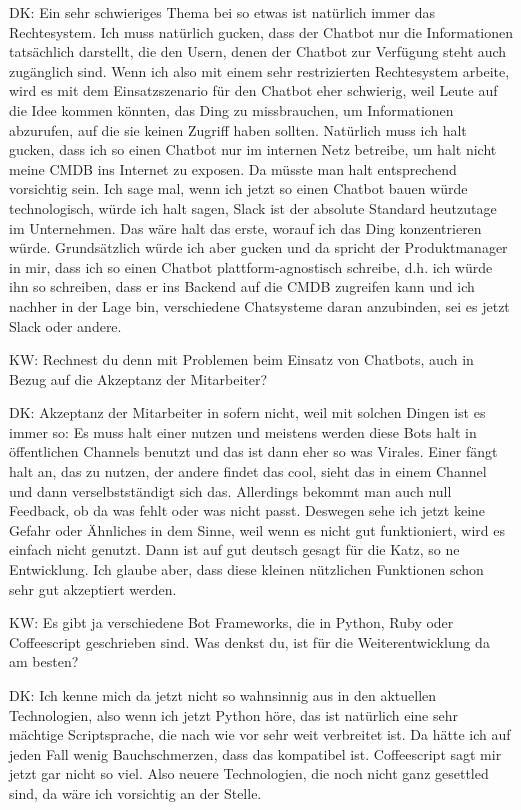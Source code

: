 \begin{list}{X:}{\setlength{\labelsep}{5mm}}
\item[DK:] Ein sehr schwieriges Thema bei so etwas ist natürlich immer das Rechtesystem. Ich muss natürlich gucken, dass der Chatbot nur die Informationen tatsächlich darstellt, die den Usern, denen der Chatbot zur Verfügung steht auch zugänglich sind. Wenn ich also mit einem sehr restrizierten Rechtesystem arbeite, wird es mit dem Einsatzszenario für den Chatbot eher schwierig, weil Leute auf die Idee kommen könnten, das Ding zu missbrauchen, um Informationen abzurufen, auf die sie keinen Zugriff haben sollten. Natürlich muss ich halt gucken, dass ich so einen Chatbot nur im internen Netz betreibe, um halt nicht meine CMDB ins Internet zu exposen. Da müsste man halt entsprechend vorsichtig sein. Ich sage mal, wenn ich jetzt so einen Chatbot bauen würde technologisch, würde ich halt sagen, Slack ist der absolute Standard heutzutage im Unternehmen. Das wäre halt das erste, worauf ich das Ding konzentrieren würde. Grundsätzlich würde ich aber gucken und da spricht der Produktmanager in mir, dass ich so einen Chatbot plattform-agnostisch schreibe, d.h. ich würde ihn so schreiben, dass er ins Backend auf die CMDB zugreifen kann und ich nachher in der Lage bin, verschiedene Chatsysteme daran anzubinden, sei es jetzt Slack oder andere.
\item[KW:] Rechnest du denn mit Problemen beim Einsatz von Chatbots, auch in Bezug auf die Akzeptanz der Mitarbeiter?
\item[DK:] Akzeptanz der Mitarbeiter in sofern nicht, weil mit solchen Dingen ist es immer so: Es muss halt einer nutzen und meistens werden diese Bots halt in öffentlichen Channels benutzt und das ist dann eher so was Virales. Einer fängt halt an, das zu nutzen, der andere findet das cool, sieht das in einem Channel und dann verselbstständigt sich das. Allerdings bekommt man auch null Feedback, ob da was fehlt oder was nicht passt. Deswegen sehe ich jetzt keine Gefahr oder Ähnliches in dem Sinne, weil wenn es nicht gut funktioniert, wird es einfach nicht genutzt. Dann ist auf gut deutsch gesagt für die Katz, so ne Entwicklung. Ich glaube aber, dass diese kleinen nützlichen Funktionen schon sehr gut akzeptiert werden.
\item[KW:] Es gibt ja verschiedene Bot Frameworks, die in Python, Ruby oder Coffeescript geschrieben sind. Was denkst du, ist für die Weiterentwicklung da am besten?
\item[DK:] Ich kenne mich da jetzt nicht so wahnsinnig aus in den aktuellen Technologien, also wenn ich jetzt Python höre, das ist natürlich eine sehr mächtige Scriptsprache, die nach wie vor sehr weit verbreitet ist. Da hätte ich auf jeden Fall wenig Bauchschmerzen, dass das kompatibel ist. Coffeescript sagt mir jetzt gar nicht so viel. Also neuere Technologien, die noch nicht ganz gesettled sind, da wäre ich vorsichtig an der Stelle.

\end{list}
